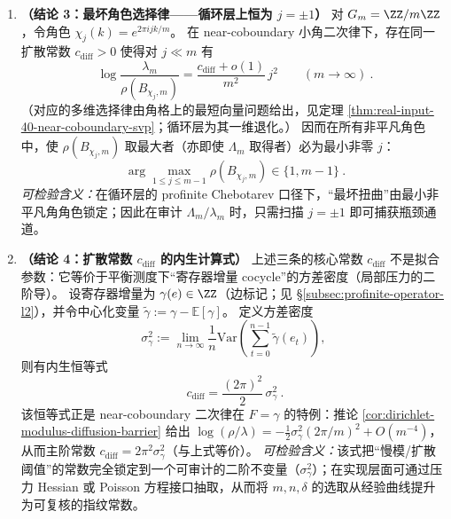 \begin{enumerate}
  \item \textbf{（结论 3：最坏角色选择律——循环层上恒为 \texorpdfstring{$j=\pm 1$}{j=±1}）}
  对 \(G_m=\ZZ/m\ZZ\)，令角色 \(\chi_j(k)=e^{2\pi i jk/m}\)。
  在 near-coboundary 小角二次律下，存在同一扩散常数 \(c_{\mathrm{diff}}>0\) 使得对 \(j\ll m\) 有
  \[
  \boxed{\ \log\frac{\lambda_m}{\rho(B_{\chi_j,m})}
  =\frac{c_{\mathrm{diff}}+o(1)}{m^2}\,j^2\qquad(m\to\infty)\ }.
  \]
  （对应的多维选择律由角格上的最短向量问题给出，见定理 \ref{thm:real-input-40-near-coboundary-svp}；循环层为其一维退化。）
  因而在所有非平凡角色中，使 \(\rho(B_{\chi_j,m})\) 取最大者（亦即使 \(\Lambda_m\) 取得者）必为最小非零 \(j\)：
  \[
  \boxed{\ \arg\max_{1\le j\le m-1}\rho(B_{\chi_j,m})\in\{1,m-1\}\ }.
  \]
  \emph{可检验含义：}在循环层的 profinite Chebotarev 口径下，“最坏扭曲”由最小非平凡角角色锁定；因此在审计 \(\Lambda_m/\lambda_m\) 时，只需扫描 \(j=\pm 1\) 即可捕获瓶颈通道。

  \item \textbf{（结论 4：扩散常数 \texorpdfstring{$c_{\mathrm{diff}}$}{c_diff} 的内生计算式）}
  上述三条的核心常数 \(c_{\mathrm{diff}}\) 不是拟合参数：它等价于平衡测度下“寄存器增量 cocycle”的方差密度（局部压力的二阶导）。
  设寄存器增量为 \(\gamma(e)\in\ZZ\)（边标记；见 \S\ref{subsec:profinite-operator-l2}），并令中心化变量 \(\tilde\gamma:=\gamma-\mathbb{E}[\gamma]\)。
  定义方差密度
  \[
  \sigma_\gamma^2:=\lim_{n\to\infty}\frac{1}{n}\mathrm{Var}\!\left(\sum_{t=0}^{n-1}\tilde\gamma(e_t)\right),
  \]
  则有内生恒等式
  \[
  \boxed{\ c_{\mathrm{diff}}=\frac{(2\pi)^2}{2}\,\sigma_\gamma^2\ }.
  \]
  该恒等式正是 near-coboundary 二次律在 \(F=\gamma\) 的特例：推论 \ref{cor:dirichlet-modulus-diffusion-barrier} 给出
  \(
  \log(\rho/\lambda)=-\frac12\sigma_\gamma^2(2\pi/m)^2+O(m^{-4})
  \)，从而主阶常数 \(c_{\mathrm{diff}}=2\pi^2\sigma_\gamma^2\)（与上式等价）。
  \emph{可检验含义：}该式把“慢模/扩散阈值”的常数完全锁定到一个可审计的二阶不变量（\(\sigma_\gamma^2\)）；在实现层面可通过压力 Hessian 或 Poisson 方程接口抽取，从而将 \(m,n,\delta\) 的选取从经验曲线提升为可复核的指纹常数。


\end{enumerate}
